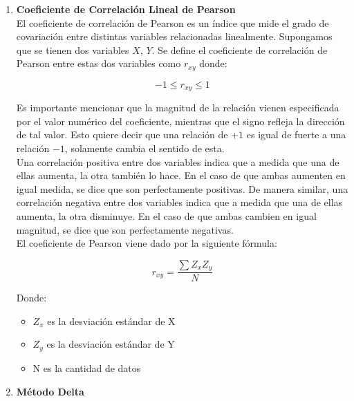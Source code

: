 \begin{enumerate}
    \item \textbf{Coeficiente de Correlación Lineal de Pearson} \\
    
    El coeficiente de correlación de Pearson es un índice que mide el grado de covariación entre distintas variables relacionadas linealmente. Supongamos que se tienen dos variables $X$, $Y$. Se define el coeficiente de correlación de Pearson entre estas dos variables como $r_{xy}$ donde:
    
    \begin{equation*}
        -1 \leq r_{xy} \leq 1
    \end{equation*} 
    
    Es importante mencionar que la magnitud de la relación vienen especificada por el valor numérico del coeficiente, mientras que el signo refleja la dirección de tal valor. Esto quiere decir que una relación de $+1$ es igual de fuerte a una relación $-1$, solamente cambia el sentido de esta.\\

    Una correlación positiva entre dos variables indica que a medida que una de ellas aumenta, la otra también lo hace. En el caso de que ambas aumenten en igual medida, se dice que son perfectamente positivas. De manera similar, una correlación negativa entre dos variables indica que a medida que una de ellas aumenta, la otra disminuye. En el caso de que ambas cambien en igual magnitud, se dice que son perfectamente negativas.\\

    El coeficiente de Pearson viene dado por la siguiente fórmula:
    
    \begin{equation}
         r_{xy} = \frac{\sum Z_x Z_y}{N} 
    \end{equation}
   
    Donde: 
    
    \begin{itemize}
        \item $Z_x$ es la desviación estándar de X
        \item $Z_y$ es la desviación estándar de Y
        \item N es la cantidad de datos 
    \end{itemize}

    \item \textbf{Método Delta} \\
    

\end{enumerate}
